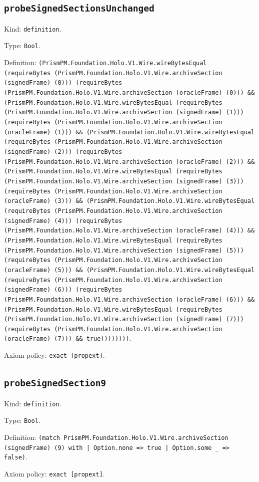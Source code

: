 \documentclass[11pt]{article}
\begin{document}
\subsection*{\texttt{probeSignedSectionsUnchanged}}
\noindent Kind: \texttt{definition}.\par
\noindent Type: \texttt{Bool}.\par
\noindent Definition: \texttt{(PrismPM.Foundation.Holo.V1.Wire.wireBytesEqual (requireBytes (PrismPM.Foundation.Holo.V1.Wire.archiveSection (signedFrame) (0))) (requireBytes (PrismPM.Foundation.Holo.V1.Wire.archiveSection (oracleFrame) (0))) \&\& (PrismPM.Foundation.Holo.V1.Wire.wireBytesEqual (requireBytes (PrismPM.Foundation.Holo.V1.Wire.archiveSection (signedFrame) (1))) (requireBytes (PrismPM.Foundation.Holo.V1.Wire.archiveSection (oracleFrame) (1))) \&\& (PrismPM.Foundation.Holo.V1.Wire.wireBytesEqual (requireBytes (PrismPM.Foundation.Holo.V1.Wire.archiveSection (signedFrame) (2))) (requireBytes (PrismPM.Foundation.Holo.V1.Wire.archiveSection (oracleFrame) (2))) \&\& (PrismPM.Foundation.Holo.V1.Wire.wireBytesEqual (requireBytes (PrismPM.Foundation.Holo.V1.Wire.archiveSection (signedFrame) (3))) (requireBytes (PrismPM.Foundation.Holo.V1.Wire.archiveSection (oracleFrame) (3))) \&\& (PrismPM.Foundation.Holo.V1.Wire.wireBytesEqual (requireBytes (PrismPM.Foundation.Holo.V1.Wire.archiveSection (signedFrame) (4))) (requireBytes (PrismPM.Foundation.Holo.V1.Wire.archiveSection (oracleFrame) (4))) \&\& (PrismPM.Foundation.Holo.V1.Wire.wireBytesEqual (requireBytes (PrismPM.Foundation.Holo.V1.Wire.archiveSection (signedFrame) (5))) (requireBytes (PrismPM.Foundation.Holo.V1.Wire.archiveSection (oracleFrame) (5))) \&\& (PrismPM.Foundation.Holo.V1.Wire.wireBytesEqual (requireBytes (PrismPM.Foundation.Holo.V1.Wire.archiveSection (signedFrame) (6))) (requireBytes (PrismPM.Foundation.Holo.V1.Wire.archiveSection (oracleFrame) (6))) \&\& (PrismPM.Foundation.Holo.V1.Wire.wireBytesEqual (requireBytes (PrismPM.Foundation.Holo.V1.Wire.archiveSection (signedFrame) (7))) (requireBytes (PrismPM.Foundation.Holo.V1.Wire.archiveSection (oracleFrame) (7))) \&\& true))))))))}.\par
\noindent Axiom policy: \texttt{exact [propext]}.\par
\subsection*{\texttt{probeSignedSection9}}
\noindent Kind: \texttt{definition}.\par
\noindent Type: \texttt{Bool}.\par
\noindent Definition: \texttt{(match PrismPM.Foundation.Holo.V1.Wire.archiveSection (signedFrame) (9) with | Option.none => true | Option.some \_ => false)}.\par
\noindent Axiom policy: \texttt{exact [propext]}.\par
\end{document}
